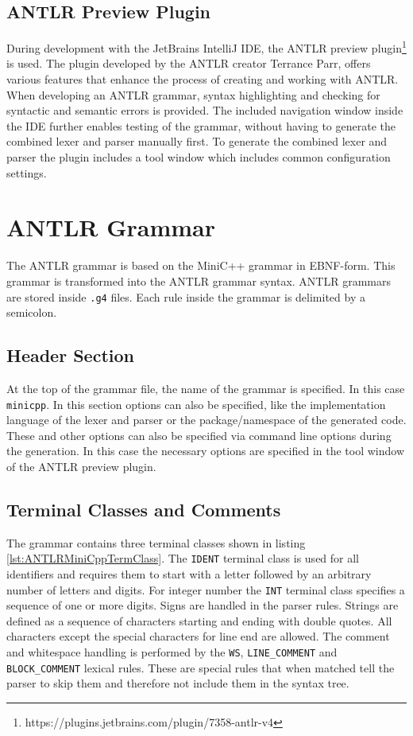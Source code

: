 \subsection{ANTLR Preview Plugin}

During development with the JetBrains IntelliJ IDE, the ANTLR preview plugin\footnote{https://plugins.jetbrains.com/plugin/7358-antlr-v4} is used. The plugin developed by the ANTLR creator Terrance Parr, offers various features that enhance the process of creating and working with ANTLR. When developing an ANTLR grammar, syntax highlighting and checking for syntactic and semantic errors is provided. The included navigation window inside the IDE further enables testing of the grammar, without having to generate the combined lexer and parser manually first. To generate the combined lexer and parser the plugin includes a tool window which includes common configuration settings.

\section{ANTLR Grammar}
\label{cha:ANTLRGrammar}

The ANTLR grammar is based on the MiniC++ grammar in EBNF-form. This grammar is transformed into the ANTLR grammar syntax. ANTLR grammars are stored inside \texttt{.g4} files. Each rule inside the grammar is delimited by a semicolon. 

\subsection{Header Section}

At the top of the grammar file, the name of the grammar is specified. In this case \texttt{minicpp}. In this section options can also be specified, like the implementation language of the lexer and parser or the package/namespace of the generated code. These and other options can also be specified via command line options during the generation. In this case the necessary options are specified in the tool window of the ANTLR preview plugin. 


\subsection{Terminal Classes and Comments}

The grammar contains three terminal classes shown in listing \ref{lst:ANTLRMiniCppTermClass}. The \texttt{IDENT} terminal class is used for all identifiers and requires them to start with a letter followed by an arbitrary number of letters and digits. For integer number the \texttt{INT} terminal class specifies a sequence of one or more digits. Signs are handled in the parser rules. Strings are defined as a sequence of characters starting and ending with double quotes. All characters except the special characters for line end are allowed. The comment and whitespace handling is performed by the \texttt{WS}, \verb|LINE_COMMENT| and \verb|BLOCK_COMMENT| lexical rules. These are special rules that when matched tell the parser to skip them and therefore not include them in the syntax tree. 

